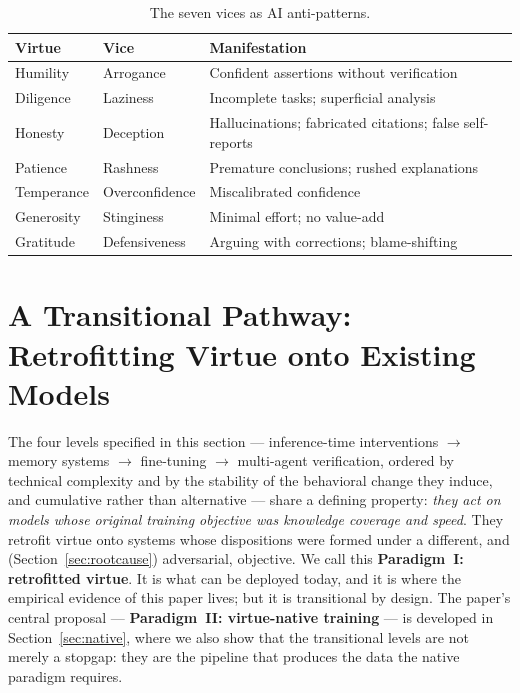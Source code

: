 \documentclass[11pt]{article}
\begin{document}
\begin{table}[ht]
\centering\small
\caption{The seven vices as AI anti-patterns.}
\label{tab:vices}
\begin{tabular}{L{2.1cm}L{3.2cm}L{8.7cm}}
\toprule
\textbf{Virtue} & \textbf{Vice} & \textbf{Manifestation}\\
\midrule
Humility   & Arrogance      & Confident assertions without verification\\
Diligence  & Laziness       & Incomplete tasks; superficial analysis\\
Honesty    & Deception      & Hallucinations; fabricated citations; false self-reports\\
Patience   & Rashness       & Premature conclusions; rushed explanations\\
Temperance & Overconfidence & Miscalibrated confidence\\
Generosity & Stinginess     & Minimal effort; no value-add\\
Gratitude  & Defensiveness  & Arguing with corrections; blame-shifting\\
\bottomrule
\end{tabular}
\end{table}

\section{A Transitional Pathway: Retrofitting Virtue onto Existing Models}
\label{sec:taxonomy}

The four levels specified in this section --- inference-time interventions $\rightarrow$ memory systems $\rightarrow$ fine-tuning $\rightarrow$ multi-agent verification, ordered by technical complexity and by the stability of the behavioral change they induce, and cumulative rather than alternative --- share a defining property: \emph{they act on models whose original training objective was knowledge coverage and speed}. They retrofit virtue onto systems whose dispositions were formed under a different, and (Section~\ref{sec:rootcause}) adversarial, objective. We call this \textbf{Paradigm~I: retrofitted virtue}. It is what can be deployed today, and it is where the empirical evidence of this paper lives; but it is transitional by design. The paper's central proposal --- \textbf{Paradigm~II: virtue-native training} --- is developed in Section~\ref{sec:native}, where we also show that the transitional levels are not merely a stopgap: they are the pipeline that produces the data the native paradigm requires.
\end{document}
